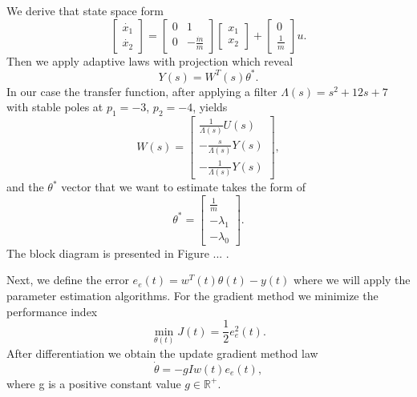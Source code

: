 \documentclass[12pt]{article}
\begin{document}
We derive that state space form 
\begin{equation}\label{eq_stateSpace}
\begin{bmatrix}
\dot{x_1} \\ \dot{x_2}
\end{bmatrix} = \begin{bmatrix}
0 & 1 \\ 0 & -\frac{\dot{m}}{m}
\end{bmatrix} \begin{bmatrix}
x_1 \\ x_2
\end{bmatrix} + \begin{bmatrix}
0 \\ \frac{1}{m}
\end{bmatrix}u.
\end{equation}
Then we apply adaptive laws with projection which reveal
\begin{equation}
Y(s)=W^T(s) \theta^{*}.
\end{equation}
In our case the transfer function, after applying a filter $\Lambda(s)=s^2+12s+7$ with stable poles at $p_1=-3$, $p_2=-4$, yields
\begin{equation}\label{eq_tfW}
W(s) = \begin{bmatrix}
\frac{1}{\Lambda(s)}U(s) \\ 
-\frac{s}{\Lambda(s)}Y(s) \\ 
-\frac{1}{\Lambda(s)}Y(s)
\end{bmatrix}, 
\end{equation}
and the $\theta^*$ vector that we want to estimate takes the form of
\begin{equation}\label{eq_tfWthetaStar}
\theta^* = \begin{bmatrix}
\frac{1}{m} \\ 
-\lambda_1 \\ 
-\lambda_0 
\end{bmatrix}. 
\end{equation}
The block diagram is presented in Figure ... .

Next, we define the error $e_e(t)=w^T(t)\theta(t)-y(t)$ where we will apply the parameter estimation algorithms. For the gradient method we minimize the performance index
\begin{equation}
\min_{\theta(t)} J(t) = \frac{1}{2} e_e^2(t).
\end{equation} 
After differentiation we obtain the update gradient method law
\begin{equation}
\dot{\theta} = -g I w(t)e_e(t),
\end{equation} 
where g is a positive constant value $g \in \mathbb{R}^+$.
\end{document}
